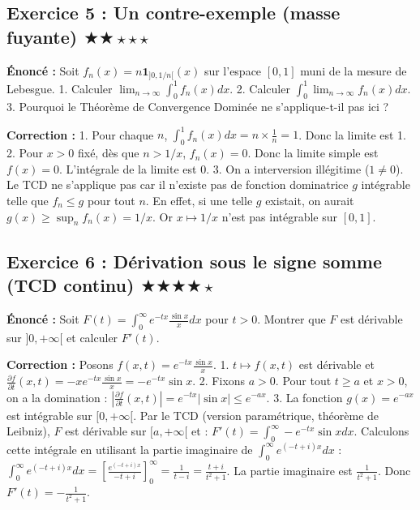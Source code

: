 \documentclass[11pt,a4paper]{article}
\begin{document}
\subsection*{Exercice 5 : Un contre-exemple (masse fuyante) \quad $\bigstar\bigstar\star\star\star$}

\textbf{Énoncé :}
Soit $f_n(x) = n \mathbf{1}_{]0, 1/n[}(x)$ sur l'espace $[0, 1]$ muni de la mesure de Lebesgue.
1. Calculer $\lim_{n \to \infty} \int_0^1 f_n(x) dx$.
2. Calculer $\int_0^1 \lim_{n \to \infty} f_n(x) dx$.
3. Pourquoi le Théorème de Convergence Dominée ne s'applique-t-il pas ici ?

\textbf{Correction :}
1. Pour chaque $n$, $\int_0^1 f_n(x) dx = n \times \frac{1}{n} = 1$. Donc la limite est 1.
2. Pour $x > 0$ fixé, dès que $n > 1/x$, $f_n(x) = 0$. Donc la limite simple est $f(x) = 0$. L'intégrale de la limite est 0.
3. On a interversion illégitime ($1 \neq 0$). Le TCD ne s'applique pas car il n'existe pas de fonction dominatrice $g$ intégrable telle que $f_n \le g$ pour tout $n$.
En effet, si une telle $g$ existait, on aurait $g(x) \ge \sup_n f_n(x) = 1/x$. Or $x \mapsto 1/x$ n'est pas intégrable sur $[0, 1]$.


\subsection*{Exercice 6 : Dérivation sous le signe somme (TCD continu) \quad $\bigstar\bigstar\bigstar\bigstar\star$}

\textbf{Énoncé :}
Soit $F(t) = \int_0^\infty e^{-tx} \frac{\sin x}{x} dx$ pour $t > 0$.
Montrer que $F$ est dérivable sur $]0, +\infty[$ et calculer $F'(t)$.

\textbf{Correction :}
Posons $f(x, t) = e^{-tx} \frac{\sin x}{x}$.
1. $t \mapsto f(x, t)$ est dérivable et $\frac{\partial f}{\partial t}(x, t) = -x e^{-tx} \frac{\sin x}{x} = -e^{-tx} \sin x$.
2. Fixons $a > 0$. Pour tout $t \ge a$ et $x > 0$, on a la domination :
   $\left| \frac{\partial f}{\partial t}(x, t) \right| = e^{-tx} |\sin x| \le e^{-ax}$.
3. La fonction $g(x) = e^{-ax}$ est intégrable sur $[0, +\infty[$.
Par le TCD (version paramétrique, théorème de Leibniz), $F$ est dérivable sur $[a, +\infty[$ et :
$F'(t) = \int_0^\infty -e^{-tx} \sin x dx$.
Calculons cette intégrale en utilisant la partie imaginaire de $\int_0^\infty e^{(-t+i)x} dx$ :
$\int_0^\infty e^{(-t+i)x} dx = \left[ \frac{e^{(-t+i)x}}{-t+i} \right]_0^\infty = \frac{1}{t-i} = \frac{t+i}{t^2+1}$.
La partie imaginaire est $\frac{1}{t^2+1}$. Donc $F'(t) = -\frac{1}{t^2+1}$.
\end{document}
